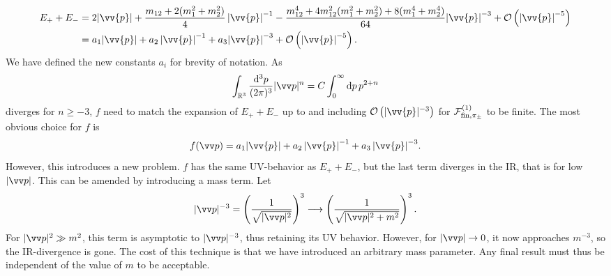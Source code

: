 \begin{align}
    \nonumber
    E_+ + E_-
    & = 
    2  \abs{\vv{p}}
    + \frac{m_{12} + 2(m_1^2 + m_2^2)}{4} \, {\abs{\vv{p}}}^{-1}
    - \frac{m_{12}^4 + 4 m_{12}^2(m_1^2 + m_2^2) + 8(m_1^4 + m_2^4)}{64}
    {\abs{\vv{p}}}^{-3}
    + \Oh[-5]{ \abs{\vv{p}}} 
    \\
    & = 
    a_1  \abs{\vv{p}}
    + a_2 \, {\abs{\vv{p}}}^{-1}
    + a_3
    {\abs{\vv{p}}}^{-3}
    + \Oh[-5]{ \abs{\vv{p}}}.
\end{align}
We have defined the new constants $a_i$ for brevity of notation.
As
\begin{equation}
    \int_{\R^3} \frac{\dd^3 p}{(2 \pi)^3} |\vv p|^{n}
    = C \int_{0}^\infty \dd p \, p^{2 + n}
\end{equation}
diverges for $n \geq -3$, $f$ need to match the expansion of $E_+ + E_-$ up to and including $\Oh[-3]{|\vv{p}|}$ for $\mathcal{F}^{(1)}_{\mathrm{fin}, \pi_\pm }$ to be finite.
The most obvious choice for $f$ is
\begin{equation}
    f(\vv p) 
    = a_1  \abs{\vv{p}} + a_2 \, {\abs{\vv{p}}}^{-1} + a_3 \, {\abs{\vv{p}}}^{-3}.
\end{equation}
However, this introduces a new problem.
$f$ has the same UV-behavior as $E_+ + E_-$, but the last term diverges in the IR, that is for low $|\vv p|$.
This can be amended by introducing a mass term.
Let
\begin{equation}
    |\vv p|^{-3} 
    = 
    \left(\frac{1}{\sqrt{|\vv p|^2}}\right)^3 
    \longrightarrow 
    \left(\frac{1}{\sqrt{|\vv p|^2 + m^2}}\right)^3.
\end{equation}
For $|\vv p|^2 \gg m^2$, this term is asymptotic to $|\vv p|^{-3}$, thus retaining its UV behavior.
However, for $|\vv p| \rightarrow 0$, it now approaches $m^{-3}$, so the IR-divergence is gone.
The cost of this technique is that we have introduced an arbitrary mass parameter.
Any final result must thus be independent of the value of $m$ to be acceptable.

